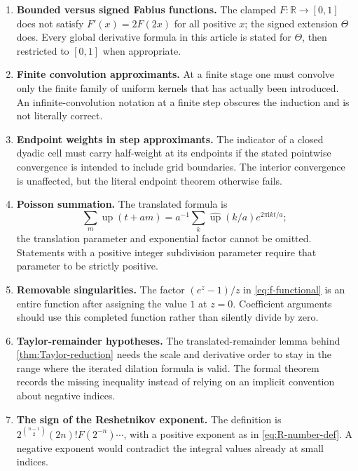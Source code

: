 \documentclass[11pt,oneside]{article}
\theoremstyle{definition}
\theoremstyle{remark}
\newcommand{\upf}{\operatorname{up}}
\newcommand{\ii}{\mathrm i}
\newcommand{\R}{\mathbb R}
\newcommand{\Thetaf}{\Theta}
\newcommand{\Fourier}{\widehat{\upf}}
\begin{document}
\begin{enumerate}
\item \textbf{Bounded versus signed Fabius functions.}
The clamped $F\colon\R\to[0,1]$ does not satisfy $F'(x)=2F(2x)$ for all positive
$x$; the signed extension $\Thetaf$ does.  Every global derivative formula in this
article is stated for $\Thetaf$, then restricted to $[0,1]$ when appropriate.

\item \textbf{Finite convolution approximants.}
At a finite stage one must convolve only the finite family of uniform kernels that
has actually been introduced.  An infinite-convolution notation at a finite step
obscures the induction and is not literally correct.

\item \textbf{Endpoint weights in step approximants.}
The indicator of a closed dyadic cell must carry half-weight at its endpoints if
the stated pointwise convergence is intended to include grid boundaries.  The
interior convergence is unaffected, but the literal endpoint theorem otherwise
fails.

\item \textbf{Poisson summation.}
The translated formula is
\[
 \sum_m\upf(t+am)=a^{-1}\sum_k\Fourier(k/a)e^{2\pi\ii kt/a};
\]
the translation parameter and exponential factor cannot be omitted.  Statements
with a positive integer subdivision parameter require that parameter to be
strictly positive.

\item \textbf{Removable singularities.}
The factor $(e^z-1)/z$ in \eqref{eq:f-functional} is an entire function after
assigning the value $1$ at $z=0$.  Coefficient arguments should use this completed
function rather than silently divide by zero.

\item \textbf{Taylor-remainder hypotheses.}
The translated-remainder lemma behind \cref{thm:Taylor-reduction} needs the scale
and derivative order to stay in the range where the iterated dilation formula is
valid.  The formal theorem records the missing inequality instead of relying on an
implicit convention about negative indices.

\item \textbf{The sign of the Reshetnikov exponent.}
The definition is
$2^{\binom{n-1}{2}}(2n)!F(2^{-n})\cdots$, with a positive exponent as in
\eqref{eq:R-number-def}.  A negative exponent would contradict the integral values
already at small indices.


\end{enumerate}
\end{document}
